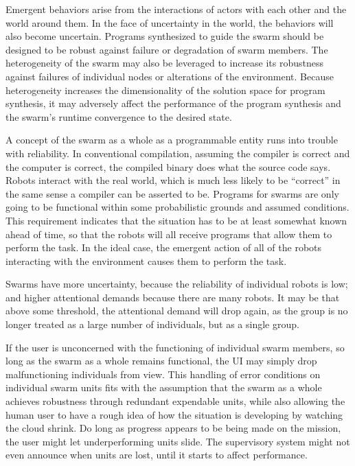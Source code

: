 \documentclass[]{article}
\begin{document}
Emergent behaviors arise from the interactions of actors with each other and the world around them. 
In the face of uncertainty in the world, the behaviors will also become uncertain. 
Programs synthesized to guide the swarm should be designed to be robust against failure or degradation of swarm members. 
The heterogeneity of the swarm may also be leveraged to increase its robustness against failures of individual nodes or alterations of the environment. 
Because heterogeneity increases the dimensionality of the solution space for program synthesis, it may adversely affect the performance of the program synthesis and the swarm's runtime convergence to the desired state.

A concept of the swarm as a whole as a programmable entity runs into trouble with reliability. 
In conventional compilation, assuming the compiler is correct and the computer is correct, the compiled binary does what the source code says. 
Robots interact with the real world, which is much less likely to be ``correct'' in the same sense a compiler can be asserted to be. 
Programs for swarms are only going to be functional within some probabilistic grounds and assumed conditions. 
This requirement indicates that the situation has to be at least somewhat known ahead of time, so that the robots will all receive programs that allow them to perform the task.
In the ideal case, the emergent action of all of the robots interacting with the environment causes them to perform the task. 

Swarms have more uncertainty, because the reliability of individual robots is low; and higher attentional demands because there are many robots. 
It may be that above some threshold, the attentional demand will drop again, as the group is no longer treated as a large number of individuals, but as a single group. 

If the user is unconcerned with the functioning of individual swarm members, so long as the swarm as a whole remains functional, the UI may simply drop malfunctioning individuals from view. 
This handling of error conditions on individual swarm units fits with the assumption that the swarm as a whole achieves robustness through redundant expendable units, while also allowing the human user to have a rough idea of how the situation is developing by watching the cloud shrink. 
Do long as progress appears to be being made on the mission, the user might let underperforming units slide. 
The supervisory system might not even announce when units are lost, until it starts to affect performance.  
\end{document}
